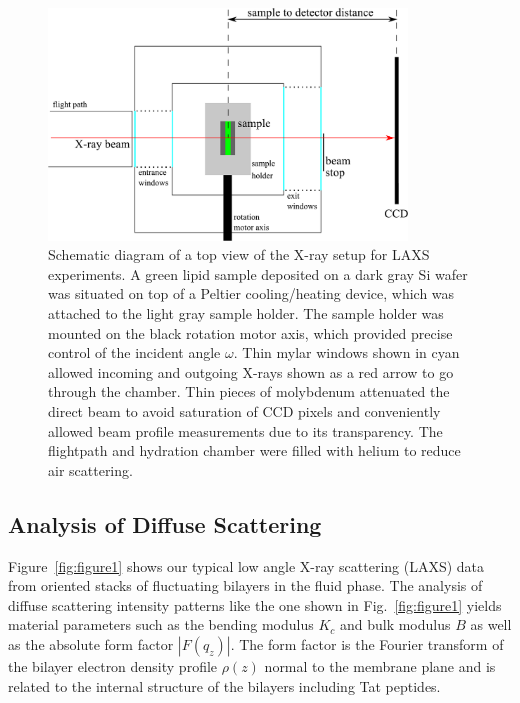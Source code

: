 \begin{figure}[htbp]
  \centering
  \includegraphics[width=0.85\textwidth]{figures/Tat/MMs/chamber_geometry}
  \caption[Schematic diagram of a top view of the X-ray setup for LAXS experiments]
  {Schematic diagram of a top view of the X-ray setup for LAXS experiments.
  A green lipid sample deposited on a dark gray Si wafer 
  was situated on top of a Peltier cooling/heating
  device, which was attached to the light gray sample holder. 
  The sample holder was mounted on the black rotation motor axis, which provided 
  precise control of the incident angle $\omega$. Thin mylar windows shown 
  in cyan allowed incoming
  and outgoing X-rays shown as a red arrow to go through the chamber.
  Thin pieces of molybdenum attenuated
  the direct beam to avoid saturation of CCD pixels and conveniently allowed 
  beam profile measurements due to its transparency. The flightpath and hydration chamber
  were filled with helium to reduce air scattering.}
  \label{fig:x-ray_setup}
\end{figure}

\subsection{Analysis of Diffuse Scattering}\label{sec:diffuse_analysis}
Figure~\ref{fig:figure1} shows our typical low angle X-ray scattering (LAXS) data 
from oriented stacks of fluctuating bilayers in the fluid phase. 
The analysis of diffuse scattering 
intensity patterns like the one shown in Fig.~\ref{fig:figure1} yields material 
parameters such as the bending modulus $K_c$ and bulk modulus $B$ as well as
the absolute form factor $|F(q_z)|$. 
The form factor is the Fourier transform of the bilayer electron 
density profile $\rho(z)$ normal to the membrane plane 
and is related to the internal structure of the
bilayers including Tat peptides.

